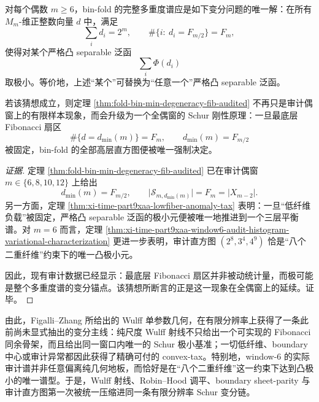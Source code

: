 \begin{conjecture}\label{conj:xi-time-part9xaa-even-window-fibonacci-schur-rigidity}
对每个偶数 \(m\ge 6\)，bin-fold 的完整多重度谱应是如下变分问题的唯一解：在所有 \(M_m\)-维正整数向量 \(d\) 中，满足
\[
\sum_i d_i=2^m,
\qquad
\#\{i:\ d_i=F_{m/2}\}=F_m,
\]
使得对某个严格凸 separable 泛函
\[
\sum_i \Phi(d_i)
\]
取极小。等价地，上述“某个”可替换为“任意一个”严格凸 separable 泛函。

若该猜想成立，则定理 \ref{thm:fold-bin-min-degeneracy-fib-audited} 不再只是审计偶窗上的有限样本现象，而会升级为一个全偶窗的 Schur 刚性原理：一旦最底层 Fibonacci 扇区
\[
\#\{d=d_{\min}(m)\}=F_m,
\qquad
d_{\min}(m)=F_{m/2}
\]
被固定，bin-fold 的全部高层直方图便被唯一强制决定。
\end{conjecture}
\begin{proof}[证据]
定理 \ref{thm:fold-bin-min-degeneracy-fib-audited} 已在审计偶窗 \(m\in\{6,8,10,12\}\) 上给出
\[
d_{\min}(m)=F_{m/2},
\qquad
\bigl|\mathcal S_{m,d_{\min}(m)}\bigr|=F_m=|X_{m-2}|.
\]
另一方面，定理 \ref{thm:xi-time-part9xaa-lowfiber-anomaly-tax} 表明：一旦“低纤维负载”被固定，严格凸 separable 泛函的极小元便被唯一地推进到一个三层平衡谱。对 \(m=6\) 而言，定理 \ref{thm:xi-time-part9xaa-window6-audit-histogram-variational-characterization} 更进一步表明，审计直方图 \((2^8,3^4,4^9)\) 恰是“八个二重纤维”约束下的唯一凸极小元。

因此，现有审计数据已经显示：最底层 Fibonacci 扇区并非被动统计量，而极可能是整个多重度谱的变分锚点。该猜想所断言的正是这一现象在全偶窗上的延续。证毕。
\end{proof}

\noindent
由此，Figalli--Zhang 所给出的 Wulff 单参数几何，在有限分辨率上获得了一条此前尚未显式抽出的变分主线：纯尺度 Wulff 射线不只给出一个可实现的 Fibonacci 同余骨架，而且给出同一窗口内唯一的 Schur 极小基准；一切低纤维、boundary 中心或审计异常都因此获得了精确可付的 convex-tax。特别地，window-\(6\) 的实际审计谱并非任意偏离纯几何地板，而恰好是在“八个二重纤维”这一约束下达到凸极小的唯一谱型。于是，Wulff 射线、Robin--Hood 调平、boundary sheet-parity 与审计直方图第一次被统一压缩进同一条有限分辨率 Schur 变分链。



\endinput
